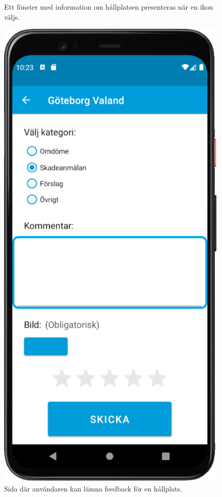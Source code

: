\documentclass{article}
\begin{document}
\begin{figure}[h]
\begin{minipage}{.47\textwidth}
  \caption{Ett fönster med information om hållplatsen presenteras när en ikon väljs.}
  \label{fig:infofonster}
\end{minipage}%
\hfill
\begin{minipage}{.47\textwidth}
  \centering
  \includegraphics[width=.92\linewidth]{documentation/images/Feedback_screen.png}
  \caption{Sida där användaren kan lämna feedback för en hållplats. \\}
  \label{fig:feedbacksida}
\end{minipage}
\end{figure}
\end{document}

